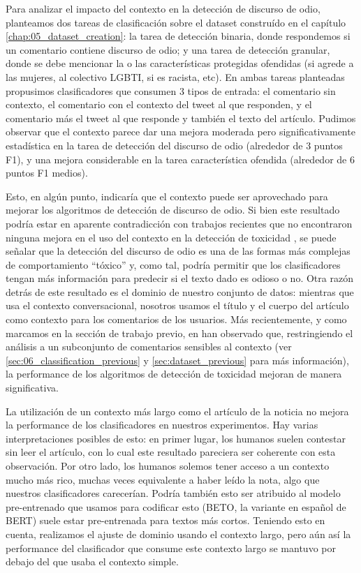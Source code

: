Para analizar el impacto del contexto en la detección de discurso de odio, planteamos dos tareas de clasificación sobre el dataset construído en el capítulo \ref{chap:05_dataset_creation}: la tarea de detección binaria, donde respondemos si un comentario contiene discurso de odio; y una tarea de detección granular, donde se debe mencionar la o las características protegidas ofendidas (si agrede a las mujeres, al colectivo LGBTI, si es racista, etc). En ambas tareas planteadas propusimos clasificadores que consumen 3 tipos de entrada: el comentario sin contexto, el comentario con el contexto del tweet al que responden, y el comentario más el tweet al que responde y también el texto del artículo. Pudimos observar que el contexto parece dar una mejora moderada pero significativamente estadística en la tarea de detección del discurso de odio (alrededor de 3 puntos F1), y una mejora considerable en la tarea característica ofendida (alrededor de 6 puntos F1 medios).

Esto, en algún punto, indicaría que el contexto puede ser aprovechado para mejorar los algoritmos de detección de discurso de odio. Si bien este resultado podría estar en aparente contradicción con trabajos recientes que no encontraron ninguna mejora en el uso del contexto en la detección de toxicidad \cite{pavlopoulos2020toxicity}, se puede señalar que la detección del discurso de odio es una de las formas más complejas de comportamiento ``tóxico'' y, como tal, podría permitir que los clasificadores tengan más información para predecir si el texto dado es odioso o no. Otra razón detrás de este resultado es el dominio de nuestro conjunto de datos: mientras que \citet{pavlopoulos2020toxicity} usa el contexto conversacional, nosotros usamos el título y el cuerpo del artículo como contexto para los comentarios de los usuarios. Más recientemente, y como marcamos en la sección de trabajo previo, en \citet{xenos-2021-context} han observado que, restringiendo el análisis a un subconjunto de comentarios sensibles al contexto (ver \ref{sec:06_classification_previous} y \ref{sec:dataset_previous} para más información), la performance de los algoritmos de detección de toxicidad mejoran de manera significativa.

La utilización de un contexto más largo como el artículo de la noticia no mejora la performance de los clasificadores en nuestros experimentos. Hay varias interpretaciones posibles de esto: en primer lugar, los humanos suelen contestar sin leer el artículo, con lo cual este resultado pareciera ser coherente con esta observación. Por otro lado, los humanos solemos tener acceso a un contexto mucho más rico, muchas veces equivalente a haber leído la nota, algo que nuestros clasificadores carecerían. Podría también esto ser atribuido al modelo pre-entrenado que usamos para codificar esto (BETO, la variante en español de BERT) suele estar pre-entrenada para textos más cortos. Teniendo esto en cuenta, realizamos el ajuste de dominio usando el contexto largo, pero aún así la performance del clasificador que consume este contexto largo se mantuvo por debajo del que usaba el contexto simple.

